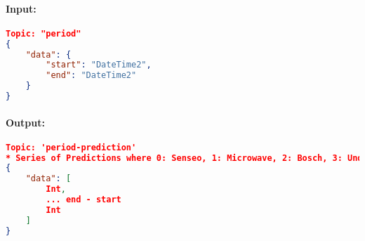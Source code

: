             \paragraph{Input:}
    
                \begin{lstlisting}[language=json,firstnumber=1]
Topic: "period"
{
    "data": {
        "start": "DateTime2",
        "end": "DateTime2"
    }
}
                \end{lstlisting}
            
                \paragraph{Output:}
            
                \begin{lstlisting}[language=json,firstnumber=1]
Topic: 'period-prediction'
* Series of Predictions where 0: Senseo, 1: Microwave, 2: Bosch, 3: Undefined, for every second
{
    "data": [
        Int,
        ... end - start
        Int
    ]
}
                \end{lstlisting}
